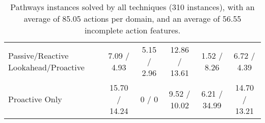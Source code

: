 \documentclass[letterpaper]{article}
\begin{document}
\begin{table*}
\begin{tabular}{|l|ccccc|}
Passive/Reactive Lookahead/Proactive	&	7.09	/	4.93	&	5.15
/	2.96	&	12.86	/	13.61	&	1.52	/	8.26	&	6.72	/	4.39	\\ 

Proactive Only	&	15.70	/	14.24	&	0	/	0	&	9.52	/	10.02	&	6.21	/	34.99	&	14.70	/	13.21	\\\hline
\end{tabular}\caption{\label{tab:t4}Pathways instances solved by all techniques
(310 instances), with an average of 85.05 actions per domain, and an average of 56.55 incomplete action features.}\end{table*}																					%
\end{document}
